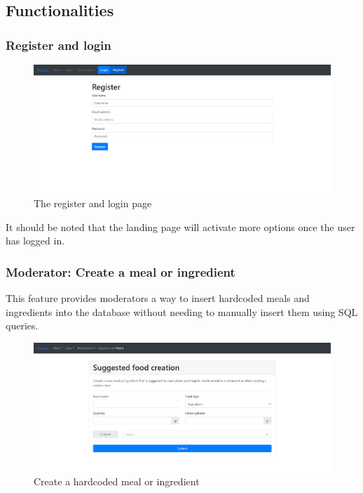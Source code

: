 \subsection{Functionalities}

\subsubsection{Register and login}

\begin{figure}[H]
    \begin{center}
        \includegraphics[scale=0.4]{_figures/register-page.png}
        \caption{The register and login page}
    \end{center}
\end{figure}

It should be noted that the landing page will activate more options once the user has logged in.\\

\subsubsection{Moderator: Create a meal or ingredient}

This feature provides moderators a way to insert hardcoded meals and ingredients into the database without
needing to manually insert them using SQL queries.\\

\begin{figure}[H]
    \begin{center}
        \includegraphics[scale=0.4]{_figures/hardcoded-meal-creation.png}
        \caption{Create a hardcoded meal or ingredient}
    \end{center}
\end{figure}

